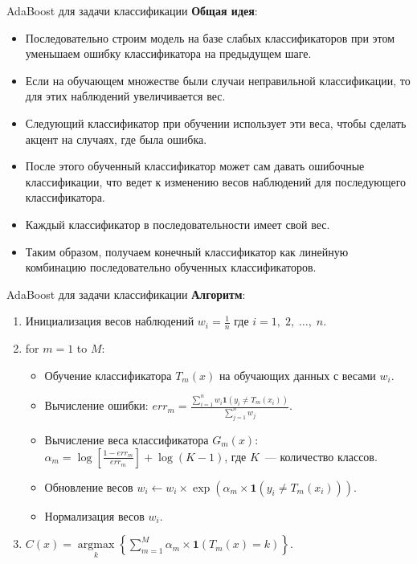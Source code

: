 \documentclass[notheorems, handout]{beamer}
\begin{document}
\begin{frame}{AdaBoost для задачи классификации}
\textbf{Общая идея}:
\begin{itemize}
	\item Последовательно строим модель на базе слабых классификаторов при этом уменьшаем ошибку классификатора на предыдущем шаге.
	\item Если на обучающем множестве были случаи неправильной классификации, то для этих наблюдений увеличивается вес.
	\item Следующий классификатор при обучении использует эти веса, чтобы сделать акцент на случаях, где была ошибка.
	\item После этого обученный классификатор может сам давать ошибочные классификации, что ведет к изменению весов наблюдений для последующего классификатора.
	\item Каждый классификатор в последовательности имеет свой вес.
	\item Таким образом, получаем конечный классификатор как линейную комбинацию последовательно обученных классификаторов.
\end{itemize} 
\end{frame}

\begin{frame}{AdaBoost для задачи классификации}
\textbf{Алгоритм}:
\begin{enumerate}
	\item Инициализация весов наблюдений $w_{i} = \frac{1}{n}$
где $i = 1,\; 2,\; \dots,\; n$.
	\item for $m = 1$ to $M$:
		\begin{itemize}
			\item Обучение классификатора $T_{m}(x)$ на обучающих данных с весами $w_{i}$.
			\item Вычисление ошибки: $err_{m} = \frac{\sum_{i = 1}^{n}w_{i} \mathbf{1}\left(y_{i} \neq T_{m}(x_{i})\right)}{\sum_{j = 1}^{n}w_{j}}$.
			\item Вычисление веса классификатора $G_{m}(x)$: $\alpha_{m} = \log \left[\frac{1 - err_{m}}{err_{m}} \right] + \log(K - 1)$, где $K$~--- количество классов.
			\item Обновление весов $w_{i} \gets w_{i} \times \exp(\alpha_{m} 	\times \mathbf{1}(y_{i} \neq T_{m}(x_{i})))$.
			\item Нормализация весов $w_{i}$.
		\end{itemize}
	\item $C(x) = \underset{k}{\operatorname{argmax}}\left\{\displaystyle\sum_{m = 1}^{M}\alpha_{m} \times \mathbf{1}(T_{m}(x) = k)\right\}$.
\end{enumerate}
\end{frame}
\end{document}
